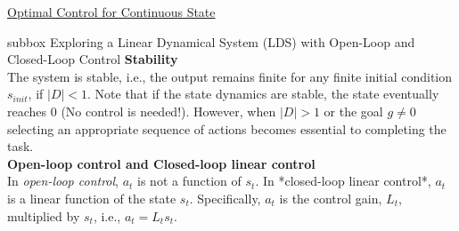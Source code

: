 \begin{textbox}{\href{https://compneuro.neuromatch.io/tutorials/W3D3_OptimalControl/student/W3D3_Tutorial2.html}{Optimal Control for Continuous State}}
\begin{subbox}{subbox}{ Exploring a Linear Dynamical System (LDS) with Open-Loop and Closed-Loop Control}
\textbf{Stability}\\

The system is stable, i.e., the output remains finite for any finite initial condition $s_{init}$, if $|D| < 1$. Note that if the state dynamics are stable, the state eventually reaches $0$ (No control is needed!). However, when $|D|>1$ or the goal $g \neq 0$ selecting an appropriate sequence of actions becomes essential to completing the task.\\


\textbf{Open-loop control and Closed-loop linear control}\\

In \textit{open-loop control}, $a_t$ is not a function of $s_t$. In *closed-loop linear control*, $a_t$ is a linear function of the state $s_t$. Specifically, $a_t$ is the control gain, $L_t$, multiplied by $s_t$, i.e., $a_t=L_t s_t$. 


\end{subbox}
\end{textbox}
